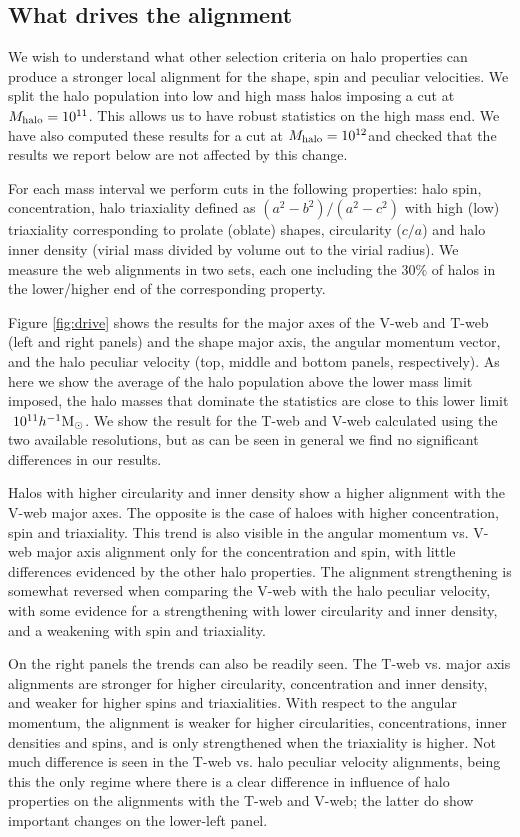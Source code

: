 \documentclass[useAMS,usenatbib]{mn2e}
\newcommand{\hMsun}{{\ifmmode{h^{-1}{\rm
        {M_{\odot}}}}\else{$h^{-1}{\rm{M_{\odot}}}$~}\fi}}
\begin{document}
\subsection{What drives the alignment}

We wish to understand what other selection criteria on halo
properties can produce a stronger local alignment for the shape, spin
and peculiar velocities. We split the halo population into low and
high mass halos imposing a cut at $M_{\rm halo}=10^{11}$\hMsun. This
allows us to have robust statistics on the high mass end. We have also
computed these results for a cut at $M_{\rm halo}=10^{12}$\hMsun and
checked that the results we report below are not affected by this
change.

For each mass interval we perform cuts in the following properties:
halo spin, concentration, halo triaxiality defined as $(a^2-b^2)/(a^2-c^2)$ with
high (low) triaxiality corresponding to prolate (oblate) shapes,
circularity ($c/a$)  and halo inner density (virial mass divided by
volume out to the virial radius). We measure the web alignments in two
sets, each one including the $30\%$ of halos in the lower/higher end
of the corresponding property. 

Figure \ref{fig:drive} shows the results for the major axes of
the V-web and T-web (left and right panels) and the shape major axis,
the angular momentum vector, and the halo peculiar velocity (top, middle
and bottom panels, respectively).  As here we show the average
of the halo population above the lower mass limit imposed, the halo
masses that dominate the statistics are close to this lower limit $~10^{11}\hMsun$.
We show the result for the T-web and V-web calculated using the two
available resolutions, but as can be seen in general we find no
significant differences in our results.

Halos with higher circularity and inner density show
a higher alignment with the V-web major axes.  The opposite is the case
of haloes with higher concentration, spin and triaxiality.  This trend
is also visible in the angular momentum vs. V-web major axis alignment only
for the concentration and spin, with little differences evidenced by the
other halo properties.  The alignment strengthening is somewhat
reversed when comparing the V-web with the halo peculiar velocity,
with some evidence for a strengthening with lower circularity and
inner density, and a weakening with spin and triaxiality.

On the right panels the trends can also be readily seen.  The T-web
vs. major axis alignments are stronger for higher circularity,
concentration and inner density, and weaker for higher spins and
triaxialities.  With respect to the angular momentum, the alignment
is weaker for higher circularities, concentrations, inner densities and
spins, and is only strengthened when the triaxiality is higher.
Not much difference is seen in the T-web vs. halo peculiar velocity
alignments, being this the only regime where there is a clear difference
in influence of halo properties on the alignments with the T-web and V-web;
the latter do show important changes on the lower-left panel.
\end{document}

